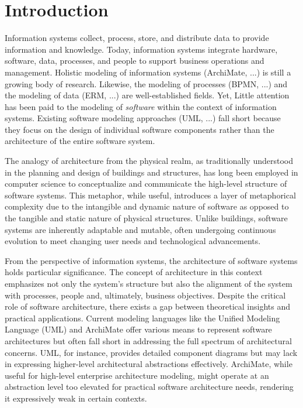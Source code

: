 \chapter{Introduction}


Information systems collect, process, store, and distribute data to provide information and knowledge.
Today, information systems integrate hardware, software, data, processes, and people to support business operations and management.
Holistic modeling of information systems (ArchiMate, ...) is still a growing body of research.
Likewise, the modeling of processes (BPMN, ...) and the modeling of data (ERM, ...) are well-established fields.
Yet, Little attention has been paid to the modeling of \textit{software} within the context of information systems.
Existing software modeling approaches (UML, ...) fall short because they focus on the design of individual software components rather than the architecture of the entire software system.

The analogy of architecture from the physical realm, as traditionally understood in the planning and design of buildings and structures, has long been employed in computer science to conceptualize and communicate the high-level structure of software systems.
This metaphor, while useful, introduces a layer of metaphorical complexity due to the intangible and dynamic nature of software as opposed to the tangible and static nature of physical structures.
Unlike buildings, software systems are inherently adaptable and mutable, often undergoing continuous evolution to meet changing user needs and technological advancements.


From the perspective of information systems, the architecture of software systems holds particular significance.
The concept of architecture in this context emphasizes not only the system's structure but also the alignment of the system with processes, people and, ultimately, business objectives.
Despite the critical role of software architecture, there exists a gap between theoretical insights and practical applications.
Current modeling languages like the Unified Modeling Language (UML) and ArchiMate offer various means to represent software architectures but often fall short in addressing the full spectrum of architectural concerns.
UML, for instance, provides detailed component diagrams but may lack in expressing higher-level architectural abstractions effectively.
ArchiMate, while useful for high-level enterprise architecture modeling, might operate at an abstraction level too elevated for practical software architecture needs, rendering it expressively weak in certain contexts.

